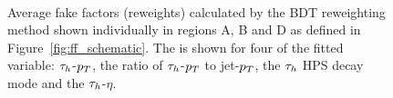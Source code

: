 \begin{figure}[!hbtp]
\centering
     \\
\caption{Average fake factors (reweights) calculated by the BDT reweighting method shown individually in regions A, B and D as defined in Figure~\ref{fig:ff_schematic}. The is shown for four of the fitted variable: $\tau_{h}$-$p_{T}$, the ratio of $\tau_{h}$-$p_{T}$ to jet-$p_{T}$, the $\tau_{h}$ HPS decay mode and the $\tau_{h}$-$\eta$.}
\label{fig:4tau_ff_reweights}
\end{figure}

